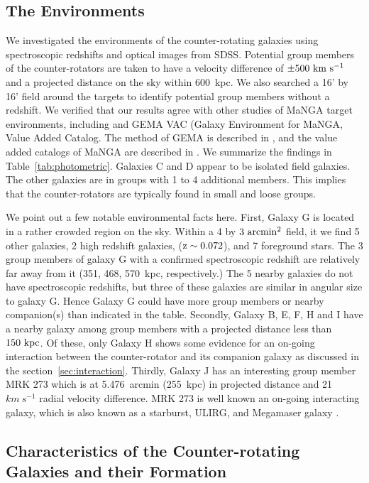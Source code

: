 \documentclass[fleqn,usenatbib]{mnras}
\begin{document}
\subsection{The Environments} \label{sec:environment}

We investigated the environments of the counter-rotating galaxies 
using spectroscopic redshifts and optical images from SDSS.
Potential group members of the counter-rotators are taken to have
a velocity difference of $\rm \pm 500~km~s^{-1}$ 
and a projected distance on the sky within 600~kpc.
We also searched a 16' by 16' field around the targets
to identify potential group members without a redshift.
We verified that our results agree with other studies of MaNGA target environments, including
\citet{Tempel2017} and GEMA VAC (Galaxy Environment for MaNGA, Value Added Catalog. 
The method of GEMA is described in \citet{Argudo2015}, 
and the value added catalogs of MaNGA are described in \citet{mangadr17}.
We summarize the findings in Table~\ref{tab:photometric}. 
Galaxies C and D appear to be isolated field galaxies.
The other galaxies are in groups with 1 to 4 additional members. 
This implies that the counter-rotators are typically found in small and loose groups. 

We point out a few notable environmental facts here.
First, Galaxy G is located in a rather crowded region on the sky.
Within a 4 by $\rm 3~arcmin^{2}$ field,
it we find 5 other galaxies, 2 high redshift galaxies,
($\rm z\sim0.072$), and 7 foreground stars.
The 3 group members of galaxy G with a confirmed spectroscopic redshift are relatively far away from it (351, 468, 570~kpc, respectively.)
The 5 nearby galaxies do not have spectroscopic redshifts, 
but three of these galaxies are similar in angular size to galaxy G. 
Hence Galaxy G could have more group members or nearby companion(s) 
than indicated in the table.
Secondly, Galaxy B, E, F, H and I have a nearby galaxy among group members 
with a projected distance less than $\rm 150~kpc$.
Of these, only Galaxy H shows some evidence 
for an on-going interaction between the counter-rotator and its companion galaxy 
as discussed in the section~\ref{sec:interaction}.
Thirdly, Galaxy J has an interesting group member MRK 273
which is at 5.476~arcmin (255~kpc) in projected distance and 21~$km~s^{-1}$ radial velocity difference.
MRK 273 is well known an on-going interacting galaxy, 
which is also known as a starburst, ULIRG, and Megamaser galaxy \citep{Mrk273megamaser,Mrk273AGN}. 


\subsection{Characteristics of the Counter-rotating Galaxies 
and their Formation} \label{sec:conclusion}
\end{document}
